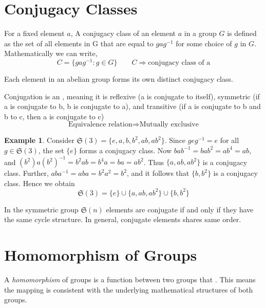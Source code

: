 \documentclass[a4paper,12pt]{article}
\theoremstyle{definition}
\newtheorem{example}{Example}[section]
\begin{document}
\section{Conjugacy Classes}
For a fixed element $a$, A conjugacy class of an element $a$ in a group $G$ is defined as the set of all elements in G that are equal to $gag^{-1}$ for some choice of $g$ in $G$. Mathematically we can write, 
\begin{equation*}
    C = \{gag^{-1}: g \in G\} \qquad C \Rightarrow \text{conjugacy class of a}
\end{equation*}
\begin{myquote}
    Each element in an abelian group forms its own distinct conjugacy class. 
\end{myquote}
Conjugation is an , meaning it is reflexive (a is conjugate to itself), symmetric (if a is conjugate to b, b is conjugate to a), and transitive (if a is conjugate to b and b to c, then a is conjugate to c)
\begin{equation*}
    \text{Equivalence relation} \Rightarrow \text{Mutually exclusive}
\end{equation*}

\begin{example}
Consider $\mathfrak{S}(3) = \{e, a, b, b^2, ab, ab^2\}$. Since $g e g^{-1} = e$ for all $g \in \mathfrak{S}(3)$, the set $\{e\}$ forms a conjugacy class.
Now $b a b^{-1} = b a b^2 = a b^4 = ab$, and $(b^2) a (b^2)^{-1} = b^2 a b = b^4 a = ba = ab^2$. Thus $\{a, ab, ab^2\}$ is a conjugacy class. Further, $a b a^{-1} = aba = b^2 a^2 = b^2$, and it follows that $\{b, b^2\}$ is a conjugacy class.
Hence we obtain 
\begin{equation*}
    \mathfrak{S}(3) = \{e\} \cup \{a, ab, ab^2\} \cup \{b, b^2\}
\end{equation*}
\end{example}
\begin{myquote}[green]
    In the symmetric group $\mathfrak{S}(n)$ elements are conjugate if and only if they have the same cycle structure. In general, conjugate elements shares same order.
\end{myquote}

\section{Homomorphism of Groups} \label{sec:Homomorphism_group}

A \textit{homomorphism} of groups is a function between two groups that 
. 
This means the mapping is consistent with the underlying mathematical structures of both groups.
\end{document}
